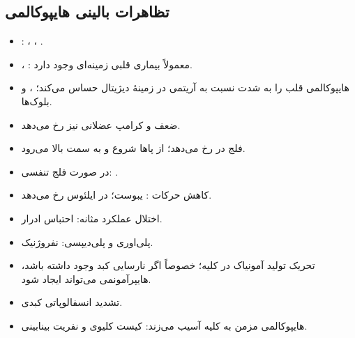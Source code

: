 \documentclass[11pt,a4paper]{article}
\begin{document}
\subsection*{تظاهرات بالینی هایپوکالمی}
\begin{itemize}
\item {}: ، ، .
\item {}، : معمولاً بیماری قلبی زمینه‌ای وجود دارد.
\item هایپوکالمی قلب را به شدت نسبت به آریتمی در زمینهٔ دیژیتال حساس می‌کند؛ ،  و بلوک‌ها.
\item ضعف و کرامپ عضلانی نیز رخ می‌دهد.
\item فلج در  رخ می‌دهد؛ از پاها شروع و به سمت بالا می‌رود.
\item در صورت فلج تنفسی: .
\item کاهش حرکات : یبوست؛ در  ایلئوس رخ می‌دهد.
\item اختلال عملکرد مثانه: احتباس ادرار.
\item پلی‌اوری و پلی‌دیپسی:  نفروژنیک.
\item تحریک تولید آمونیاک در کلیه؛ خصوصاً اگر نارسایی کبد وجود داشته باشد، هایپرآمونمی می‌تواند ایجاد شود.
\item تشدید انسفالوپاتی کبدی.
\end{itemize}

\begin{itemize}
\item هایپوکالمی مزمن به کلیه آسیب می‌زند: کیست کلیوی و نفریت بینابینی.
\end{itemize}
\end{document}
